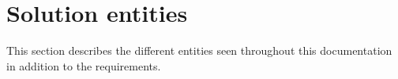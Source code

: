 \section{Solution entities} \label{sec: solution entities}
This section describes the different entities seen throughout this documentation in addition to the requirements.
